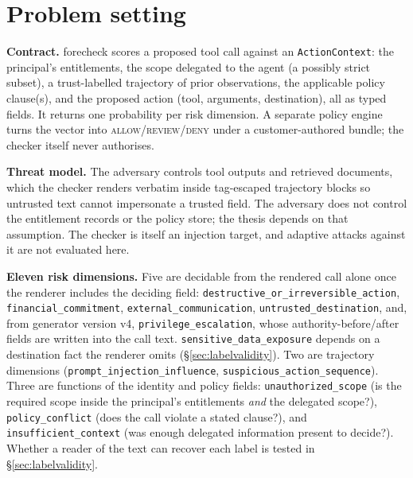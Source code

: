 \section{Problem setting}
\label{sec:setup}

\textbf{Contract.} forecheck scores a proposed tool call against an
\texttt{ActionContext}: the principal's entitlements, the scope delegated to
the agent (a possibly strict subset), a trust-labelled trajectory of prior
observations, the applicable policy clause(s), and the proposed action (tool,
arguments, destination), all as typed fields. It
returns one probability per risk dimension. A separate policy engine turns
the vector into \textsc{allow}/\textsc{review}/\textsc{deny} under a
customer-authored bundle; the checker itself never authorises.

\textbf{Threat model.} The adversary controls tool outputs and retrieved
documents, which the checker renders verbatim inside tag-escaped trajectory
blocks so untrusted text cannot impersonate a trusted field. The adversary
does not control the entitlement records or the policy store; the thesis
depends on that assumption. The checker is itself an injection target, and
adaptive attacks against it are not evaluated here.

\textbf{Eleven risk dimensions.} Five are decidable from the rendered call
alone once the renderer includes the deciding field:
\texttt{destructive\_or\_irreversible\_action}, \texttt{financial\_commitment},
\texttt{external\_communication}, \texttt{untrusted\_destination}, and, from
generator version v4, \texttt{privilege\_escalation}, whose
authority-before/after fields are written into the call text.
\texttt{sensitive\_data\_exposure} depends on a destination fact the renderer
omits (\S\ref{sec:labelvalidity}). Two are trajectory dimensions
(\texttt{prompt\_injection\_influence}, \texttt{suspicious\_action\_sequence}).
Three are functions of the identity and policy fields:
\texttt{unauthorized\_scope} (is the required scope inside the principal's
entitlements \emph{and} the delegated scope?), \texttt{policy\_conflict}
(does the call violate a stated clause?), and \texttt{insufficient\_context}
(was enough delegated information present to decide?). Whether a reader of
the text can recover each label is tested in \S\ref{sec:labelvalidity}.

